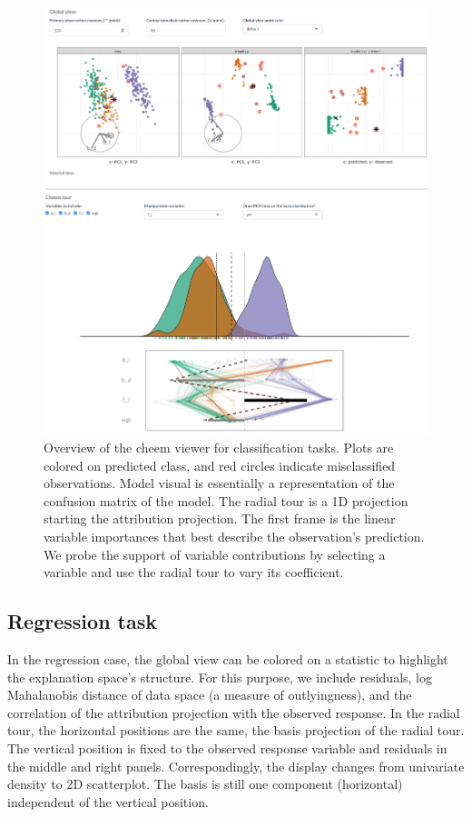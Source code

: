 \documentclass[
]{article}
\begin{document}
\begin{figure}

{\centering \includegraphics[width=1\linewidth]{./figures/app_classification} 

}

\caption{Overview of the cheem viewer for classification tasks. Plots are colored on predicted class, and red circles indicate misclassified observations. Model visual is essentially a representation of the confusion matrix of the model. The radial tour is a 1D projection starting the attribution projection. The first frame is the linear variable importances that best describe the observation's prediction. We probe the support of variable contributions by selecting a variable and use the radial tour to vary its coefficient.}\label{fig:classificationcase}
\end{figure}

\hypertarget{regression-task}{%
\subsection{Regression task}\label{regression-task}}

In the regression case, the global view can be colored on a statistic to highlight the explanation space's structure. For this purpose, we include residuals, log Mahalanobis distance of data space (a measure of outlyingness), and the correlation of the attribution projection with the observed response. In the radial tour, the horizontal positions are the same, the basis projection of the radial tour. The vertical position is fixed to the observed response variable and residuals in the middle and right panels. Correspondingly, the display changes from univariate density to 2D scatterplot. The basis is still one component (horizontal) independent of the vertical position.
\end{document}
